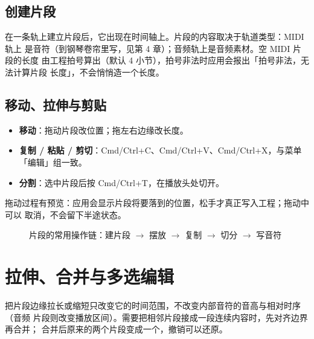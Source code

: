 \subsection{创建片段}

在一条轨上建立片段后，它出现在时间轴上。片段的内容取决于轨道类型：MIDI 轨上
是音符（到钢琴卷帘里写，见第 4 章）；音频轨上是音频素材。空 MIDI 片段的长度
由工程拍号算出（默认 4 小节），拍号非法时应用会报出「拍号非法，无法计算片段
长度」，不会悄悄造一个长度。

\subsection{移动、拉伸与剪贴}

\begin{itemize}
  \item \textbf{移动}：拖动片段改位置；拖左右边缘改长度。
  \item \textbf{复制 / 粘贴 / 剪切}：Cmd/Ctrl+C、Cmd/Ctrl+V、Cmd/Ctrl+X，与菜单「编辑」组一致。
  \item \textbf{分割}：选中片段后按 Cmd/Ctrl+T，在播放头处切开。
\end{itemize}

拖动过程有预览：应用会显示片段将要落到的位置，松手才真正写入工程；拖动中可以
取消，不会留下半途状态。

\begin{figure}[htbp]
\centering
{}
\caption{片段的常用操作链：建片段 $\to$ 摆放 $\to$ 复制 $\to$ 切分 $\to$ 写音符}
\label{fig:ch03-clip-flow}
\end{figure}

\section{拉伸、合并与多选编辑}

把片段边缘拉长或缩短只改变它的时间范围，不改变内部音符的音高与相对时序（音频
片段则改变播放区间）。需要把相邻片段接成一段连续内容时，先对齐边界再合并；
合并后原来的两个片段变成一个，撤销可以还原。

